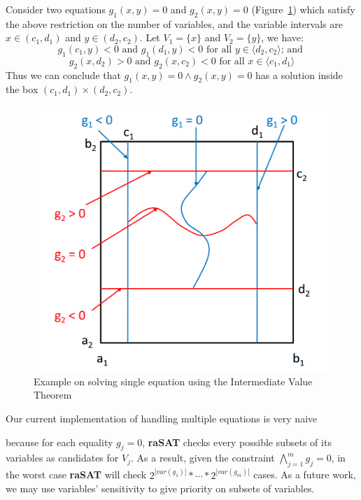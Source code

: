 \documentclass[runningheads,a4paper,oribibl]{llncs}
\begin{document}
\begin{example}
Consider two equations $g_1(x, y)=0$ and $g_2(x, y) = 0$ (Figure~\ref{fig:multiple-equations}) which satisfy the above restriction on the number of variables, and the variable intervals are $x \in (c_1, d_1)$ and $y \in(d_2, c_2)$. Let $V_1 = \{x\}$ and $V_2 = \{y\}$, we have:
\[g_1(c_1, y) < 0\text{ and }g_1(d_1, y) < 0 \text{ for all } y \in \langle d_2, c_2 \rangle \text{; and }\]
\[g_2(x, d_2) > 0 \text{ and }g_2(x, c_2) < 0 \text{ for all } x \in \langle c_1, d_1 \rangle\]
Thus we can conclude that $g_1(x,y)=0 \wedge g_2(x,y)=0$ has a solution inside the box $(c_1, d_1) \times (d_2, c_2)$.
\end{example}
\begin{figure}[ht]
\centering
\includegraphics[scale=0.4]{multipleEquations.png} 
\caption{Example on solving single equation using the Intermediate Value Theorem} 
\label{fig:multiple-equations} 
\end{figure}
Our current implementation of handling multiple equations is very naive  because for each equality $g_j = 0$, \textbf{raSAT} checks every possible subsets of its variables as candidates for $V_j$. As a result, given the constraint $\bigwedge\limits_{j=1}^mg_j=0$, in the worst case \textbf{raSAT} will check $2^{|var(g_1)|}*\cdots*2^{|var(g_m)|}$ cases. As a future work, we may use variables' sensitivity to give priority on subsets of variables.
\end{document}
